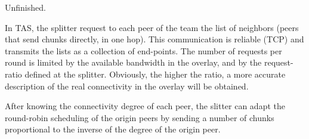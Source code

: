 
\label{sec:TAS}

\begin{notex}
  Unfinished.
\end{notex}

In TAS, the splitter request to each peer of the team the list of
neighbors (peers that send chunks directly, in one hop). This
communication is reliable (TCP) and transmits the lists as a
collection of end-points. The number of requests per round is limited
by the available bandwidth in the overlay, and by the request-ratio
defined at the splitter. Obviously, the higher the ratio, a more
accurate description of the real connectivity in the overlay will be
obtained.


After knowing the connectivity degree of each peer, the slitter can
adapt the round-robin scheduling of the origin peers by sending a
number of chunks proportional to the inverse of the degree of the
origin peer.

